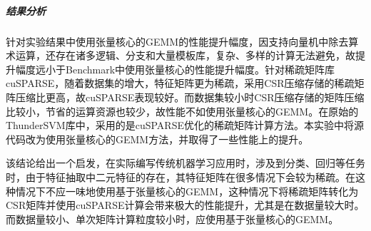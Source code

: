 \subparagraph{结果分析}
\par 针对实验结果中使用张量核心的GEMM的性能提升幅度，因支持向量机中除去算术运算，还存在诸多逻辑、分支和大量模板库，复杂、多样的计算无法避免，故提升幅度远小于Benchmark中使用张量核心的性能提升幅度。针对稀疏矩阵库cuSPARSE，随着数据集的增大，特征矩阵更为稀疏，采用CSR压缩存储的稀疏矩阵压缩比更高，故cuSPARSE表现较好。而数据集较小时CSR压缩存储的矩阵压缩比较小，节省的运算资源也较少，故性能不如使用张量核心的GEMM。在原始的ThunderSVM库中，采用的是cuSPARSE优化的稀疏矩阵计算方法。本实验中将源代码改为使用张量核心的GEMM方法，并取得了一些性能上的提升。
\par 该结论给出一个启发，在实际编写传统机器学习应用时，涉及到分类、回归等任务时，由于特征抽取中二元特征的存在，其特征矩阵在很多情况下会较为稀疏。在这种情况下不应一味地使用基于张量核心的GEMM，这种情况下将稀疏矩阵转化为CSR矩阵并使用cuSPARSE计算会带来极大的性能提升，尤其是在数据量较大时。而数据量较小、单次矩阵计算粒度较小时，应使用基于张量核心的GEMM。
